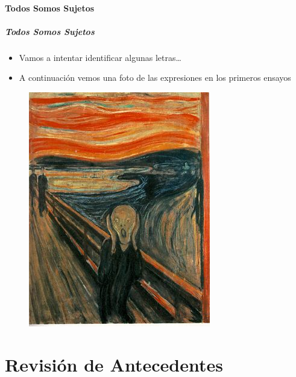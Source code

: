 \documentclass[10pt]{beamer}
\begin{document}
  \subsection{Todos Somos Sujetos}
      \begin{frame}
	\frametitle{Todos Somos Sujetos}
	\begin{itemize}
		\item Vamos a intentar identificar algunas letras\ldots\pause
		\item A continuación vemos una foto de las expresiones en los primeros ensayos\pause
	\end{itemize}
	\begin{figure}
		\includegraphics[height=0.6\textheight]{graficos/elGrito.jpg}
	\end{figure}
      \end{frame}

\part[Antecedentes]{Revisi\'on de Antecedentes}
\frame{\partpage}
\end{document}
